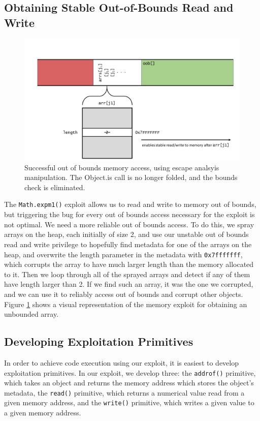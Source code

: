 \documentclass[11pt]{article}
\begin{document}
\subsection{Obtaining Stable Out-of-Bounds Read and Write}
\begin{figure}
	\centering
	\includegraphics[width=\linewidth]{oob.jpg}
	\caption{Successful out of bounds memory access, using escape analsyis manipulation. The
	Object.is call is no longer folded, and the bounds check is eliminated.}
  \label{fig:oob}
\end{figure}

The \texttt{Math.expm1()} exploit allows us to read and write to memory out of bounds, but
triggering the bug for every out of bounds access necessary for the exploit is not optimal. We need
a more reliable out of bounds access. To do this, we spray arrays on the heap, each initially of
size 2, and use our unstable out of bounds read and write privilege to hopefully find metadata for
one of the arrays on the heap, and overwrite the length parameter in the metadata with
\texttt{0x7fffffff}, which corrupts the array to have much larger length than the memory allocated
to it. Then we loop through all of the sprayed arrays and detect if any of them have length larger
than 2. If we find such an array, it was the one we corrupted, and we can use it to reliably access
out of bounds and corrupt other objects. Figure \ref{fig:oob} shows a visual representation of the 
memory exploit for obtaining an unbounded array.

\subsection{Developing Exploitation Primitives}
In order to achieve code execution using our exploit, it is easiest to develop exploitation
primitives. In our exploit, we develop three: the \texttt{addrof()} primitive, which takes an object
and returns the memory address which stores the object's metadata, the \texttt{read()} primitive,
which returns a numerical value read from a given memory address, and the \texttt{write()}
primitive, which writes a given value to a given memory address. 
\end{document}

